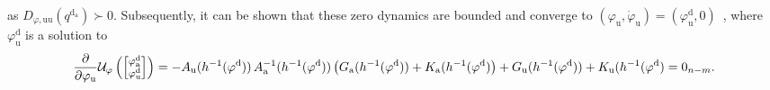 as $D_{\varphi,\mathrm{uu}}(q^{\mathrm{d}_\mathrm{a}}) \succ 0$.
Subsequently, it can be shown that these zero dynamics are bounded and converge to $(\varphi_\mathrm{u},\dot{\varphi}_\mathrm{u}) = (\varphi_\mathrm{u}^\mathrm{d}, 0)$~\citep{pustina2025analysis}, where $\varphi_\mathrm{u}^\mathrm{d}$ is a solution to
\begin{equation}\footnotesize
    \frac{\partial }{\partial \varphi_\mathrm{u}} \mathcal{U}_\varphi \left ( \begin{bmatrix}
        \varphi_\mathrm{a}^\mathrm{d}\\ \varphi_\mathrm{u}^\mathrm{d}
    \end{bmatrix} \right ) = -A_\mathrm{u}(h^{-1}(\varphi^\mathrm{d})) \, A_\mathrm{a}^{-1}(h^{-1}(\varphi^\mathrm{d})) \left ( G_\mathrm{a}(h^{-1}(\varphi^\mathrm{d})) + K_\mathrm{a}(h^{-1}(\varphi^\mathrm{d}) \right ) + G_\mathrm{u}(h^{-1}(\varphi^\mathrm{d})) + K_\mathrm{u}(h^{-1}(\varphi^\mathrm{d}) = 0_{n-m}.
\end{equation}

